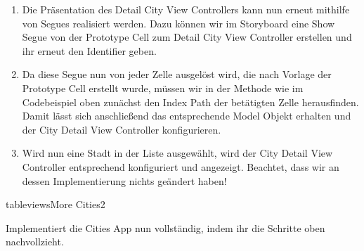 \documentclass[parskip=half, final]{scrreprt}
\begin{document}
\begin{lecture}
\begin{enumerate}
\item Die Präsentation des Detail City View Controllers kann nun erneut mithilfe von Segues realisiert werden. Dazu können wir im Storyboard eine Show Segue von der Prototype Cell zum Detail City View Controller erstellen und ihr erneut den Identifier  geben.

\item Da diese Segue nun von jeder Zelle ausgelöst wird, die nach Vorlage der Prototype Cell erstellt wurde, müssen wir in der  Methode wie im Codebeispiel oben zunächst den Index Path der betätigten Zelle herausfinden. Damit lässt sich anschließend das entsprechende Model Objekt erhalten und der City Detail View Controller konfigurieren.

\item Wird nun eine Stadt in der Liste ausgewählt, wird der City Detail View Controller entsprechend konfiguriert und angezeigt. Beachtet, dass wir an dessen Implementierung nichts geändert haben!

\end{enumerate}

\begin{exc}

\begin{excitem}{tableviews}{More Cities}{2}

Implementiert die Cities App nun vollständig, indem ihr die Schritte oben nachvollzieht.

\end{excitem}

\end{exc}


\end{lecture}



\end{document}
